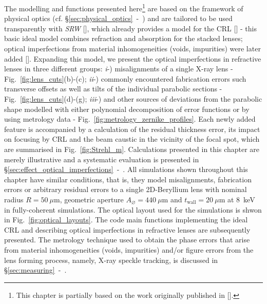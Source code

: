 \begin{refsection}
The modelling and functions presented here\footnote{This chapter is partially based on the work originally published in [\cite{Celestre2020b}].} are based on the framework of physical optics (cf. \S\ref{sec:physical_optics}~-~\textit{}) and are tailored to be used transparently with \textit{SRW} [\cite{Chubar1998}], which already provides a model for the CRL [\cite{Baltser2011}] - this basic ideal model combines refraction and absorption for the stacked lenses; optical imperfections from material inhomogeneities (voids, impurities) were later added [\cite{Roth2014}]. Expanding this model, we present the optical imperfections in refractive lenses in three different groups: \textit{i}-) misalignments of a single X-ray lens - Fig.~\ref{fig:lens_cuts}(b)-(c); \textit{ii}-) commonly encountered fabrication errors such transverse offsets as well as tilts of the individual parabolic sections - Fig.~\ref{fig:lens_cuts}(d)-(g); \textit{iii}-) and other sources of deviations from the parabolic shape modelled with either polynomial decomposition of error functions or by using metrology data - Fig.~\ref{fig:metrology_zernike_profiles}. Each newly added feature is accompanied by a calculation of the residual thickness error, its impact on focusing by CRL and the beam caustic in the vicinity of the focal spot, which are summarised in Fig.~\ref{fig:Strehl_m}. Calculations presented in this chapter are merely illustrative and a systematic evaluation is presented in \S\ref{sec:effect_optical_imperfections}~-~\textit{}. All simulations shown throughout this chapter have similar conditions, that is, they model misalignments, fabrication errors or arbitrary residual errors to a single 2D-Beryllium lens with nominal radius $R=50~\mu\text{m}$, geometric aperture $A_{\diameter}=440~\mu\text{m}$ and $t_\text{wall}=20~\mu$m at 8~keV in fully-coherent simulations. The optical layout used for the simulations is shwon in Fig.~\ref{fig:optical_layouts}. The code main functions implementing the ideal CRL and describing optical imperfections in refractive lenses are subsequently presented. The metrology technique used to obtain the phase errors that arise from material inhomogeneities (voids, impurities) and/or figure errors from the lens forming process, namely, X-ray speckle tracking, is discussed in \S\ref{sec:measuring}~-~\textit{}.


\end{refsection}
